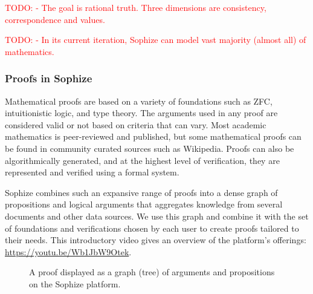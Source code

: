 \documentclass[a4paper]{article}
\newcommand\todo[1]{\textcolor{red}{TODO: #1}}
\begin{document}
\todo{- The goal is rational truth. Three dimensions are consistency, correspondence and values.}

\todo{- In its current iteration, Sophize can model vast majority (almost all)  of mathematics.}

\subsubsection*{Proofs in Sophize}

Mathematical proofs are based on a variety of foundations such as ZFC, intuitionistic logic, and type theory. The arguments used in any proof are considered valid or not based on criteria that can vary. Most academic mathematics is peer-reviewed and published, but some mathematical proofs can be found in community curated sources such as Wikipedia. Proofs can also be algorithmically generated, and at the highest level of verification, they are represented and verified using a formal system. 

Sophize combines such an expansive range of proofs into a dense graph of propositions and logical arguments that aggregates knowledge from several documents and other data sources. We use this graph and combine it with the set of foundations and verifications chosen by each user to create proofs tailored to their needs. This introductory video gives an overview of the platform's offerings: \url{https://youtu.be/Wb1JbW9Otek}.

\begin{figure}[ht]
\begin{center}
\caption{A proof displayed as a graph (tree) of arguments and propositions on the Sophize platform.}
\label{proof_tree}
\end{center}
\end{figure}
\end{document}
